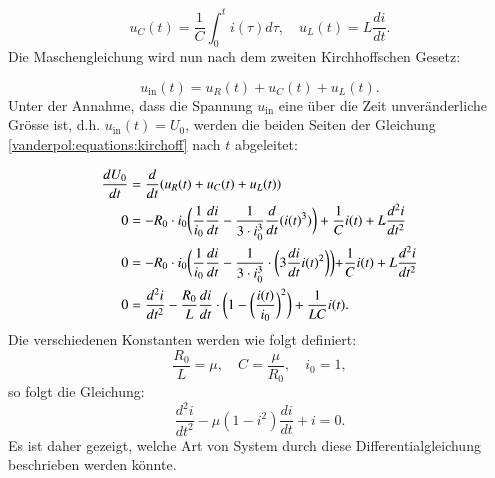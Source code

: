 \begin{equation*}
u_C(t) = \frac{1}{C} \int_{0}^{t} i(\tau) d\tau, \quad u_L(t) = L \frac{di}{dt}.
\end{equation*}
Die Maschengleichung wird nun nach dem zweiten Kirchhoffschen Gesetz:
%
%

\begin{equation}
u_{\text{in}}(t) = u_R(t) + u_C(t) + u_L(t).
\label{vanderpol:equations:kirchoff}
\end{equation}
Unter der Annahme, dass die Spannung $u_{\text{in}}$ eine über die Zeit unveränderliche Grösse ist, d.h. $u_{\text{in}}(t) = U_0$, werden die beiden Seiten der Gleichung \eqref{vanderpol:equations:kirchoff} nach $t$ abgeleitet:

\begin{align}
\frac{dU_0}{dt} &= \frac{d}{dt}(u_R(t) + u_C(t) + u_L(t))\\
0 &= -R_0 \cdot i_0 \biggl(\frac{1}{i_0} \frac{di}{dt} - \frac{1}{3 \cdot i_0^3} \frac{d}{dt} (i(t)^3) \biggr) + \frac{1}{C} i(t) + L \frac{d^2i}{dt^2} \notag \\
0 &= -R_0 \cdot i_0 \biggl(\frac{1}{i_0} \frac{di}{dt} - \frac{1}{3 \cdot i_0^3} \cdot \biggl( 3 \frac{di}{dt} i(t)^2 \biggr) \biggl) + \frac{1}{C} i(t) + L \frac{d^2i}{dt^2} \notag \\
0 &= \frac{d^2i}{dt^2} - \frac{R_0}{L}  \frac{di}{dt} \cdot \biggl(1- \biggl(\frac{i(t)}{i_0}\biggr)^2 \biggr) + \frac{1}{LC} i(t).
\end{align}
Die verschiedenen Konstanten werden wie folgt definiert:
\begin{equation*}
\frac{R_0}{L}=\mu, \quad C=\frac{\mu}{R_0}, \quad i_0 = 1,
\end{equation*}
so folgt die Gleichung:
\begin{equation}
\frac{d^{2}i}{dt^{2}} - \mu (1 - i^{2}) \frac{di}{dt} + i = 0.
\label{vanderpol:equations:vdp_i}
\end{equation}
Es ist daher gezeigt, welche Art von System durch diese Differentialgleichung beschrieben werden könnte.

